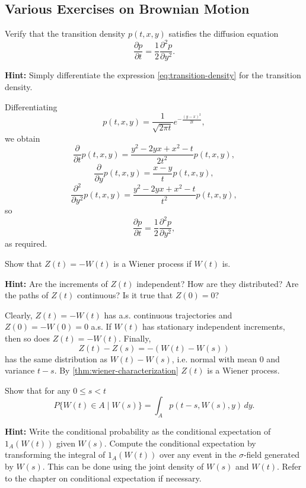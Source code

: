 \subsection{Various Exercises on Brownian Motion}
\label{sec:brownian-exercises}

\begin{Exercise}
\label{ex:diffusion-equation}
Verify that the transition density $p(t, x, y)$ satisfies the diffusion equation
\[
\frac{\partial p}{\partial t} = \frac{1}{2} \frac{\partial^2 p}{\partial y^2}.
\]

\noindent\textbf{Hint:} Simply differentiate the expression \cref{eq:transition-density} for the transition density.
\end{Exercise}

\begin{Solution}
Differentiating
\[
p(t, x, y) = \frac{1}{\sqrt{2\pi t}} e^{-\frac{(y-x)^2}{2t}},
\]
we obtain
\[
\frac{\partial}{\partial t} p(t, x, y) = \frac{y^2 - 2yx + x^2 - t}{2t^2} p(t, x, y),
\]
\[
\frac{\partial}{\partial y} p(t, x, y) = \frac{x - y}{t} p(t, x, y),
\]
\[
\frac{\partial^2}{\partial y^2} p(t, x, y) = \frac{y^2 - 2yx + x^2 - t}{t^2} p(t, x, y),
\]
so
\[
\frac{\partial p}{\partial t} = \frac{1}{2} \frac{\partial^2 p}{\partial y^2},
\]
as required.
\end{Solution}

\begin{Exercise}
\label{ex:wiener-negative}
Show that $Z(t) = -W(t)$ is a Wiener process if $W(t)$ is.

\noindent\textbf{Hint:} Are the increments of $Z(t)$ independent? How are they distributed? Are the paths of $Z(t)$ continuous? Is it true that $Z(0) = 0$?
\end{Exercise}

\begin{Solution}
Clearly, $Z(t) = -W(t)$ has a.s. continuous trajectories and $Z(0) = -W(0) = 0$ a.s. If $W(t)$ has stationary independent increments, then so does $Z(t) = -W(t)$. Finally,
\[
Z(t) - Z(s) = -(W(t) - W(s))
\]
has the same distribution as $W(t) - W(s)$, i.e. normal with mean 0 and variance $t - s$. By \cref{thm:wiener-characterization} $Z(t)$ is a Wiener process.
\end{Solution}

\begin{Exercise}
\label{ex:wiener-conditional-density}
Show that for any $0 \leq s < t$
\[
P\{W(t) \in A \mid W(s)\} = \int_A p(t - s, W(s), y) \, dy.
\]

\noindent\textbf{Hint:} Write the conditional probability as the conditional expectation of $1_A(W(t))$ given $W(s)$. Compute the conditional expectation by transforming the integral of $1_A(W(t))$ over any event in the $\sigma$-field generated by $W(s)$. This can be done using the joint density of $W(s)$ and $W(t)$. Refer to the chapter on conditional expectation if necessary.
\end{Exercise}

